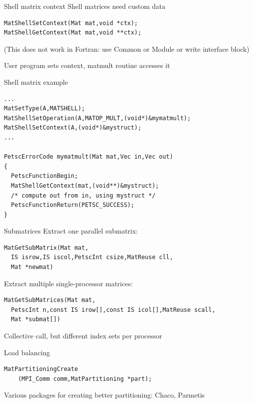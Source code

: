 \begin{longstory}

\begin{numberedframe}{Shell matrix context}
Shell matrices need custom data
\begin{lstlisting}
MatShellSetContext(Mat mat,void *ctx);
MatShellGetContext(Mat mat,void **ctx);
\end{lstlisting}
(This does not work in Fortran: use Common or Module
or write interface block)

User program sets context, matmult routine accesses it
\end{numberedframe}

\begin{numberedframe}{Shell matrix example}
\begin{lstlisting}
...
MatSetType(A,MATSHELL);
MatShellSetOperation(A,MATOP_MULT,(void*)&mymatmult);
MatShellSetContext(A,(void*)&mystruct);
...

PetscErrorCode mymatmult(Mat mat,Vec in,Vec out)
{
  PetscFunctionBegin;
  MatShellGetContext(mat,(void**)&mystruct);
  /* compute out from in, using mystruct */
  PetscFunctionReturn(PETSC_SUCCESS);
}
\end{lstlisting}
\end{numberedframe}


\begin{numberedframe}{Submatrices}
Extract one parallel submatrix:
\begin{lstlisting}
MatGetSubMatrix(Mat mat,
  IS isrow,IS iscol,PetscInt csize,MatReuse cll,
  Mat *newmat)
\end{lstlisting}
Extract multiple single-processor matrices:
{\small
\begin{lstlisting}
MatGetSubMatrices(Mat mat,
  PetscInt n,const IS irow[],const IS icol[],MatReuse scall,
  Mat *submat[])
\end{lstlisting}
}
Collective call, but different index sets per processor
\end{numberedframe}

\begin{numberedframe}{Load balancing}

\begin{lstlisting}
MatPartitioningCreate
    (MPI_Comm comm,MatPartitioning *part);
\end{lstlisting}
Various packages for creating better partitioning: Chaco, Parmetis


\end{numberedframe}
\end{longstory}
